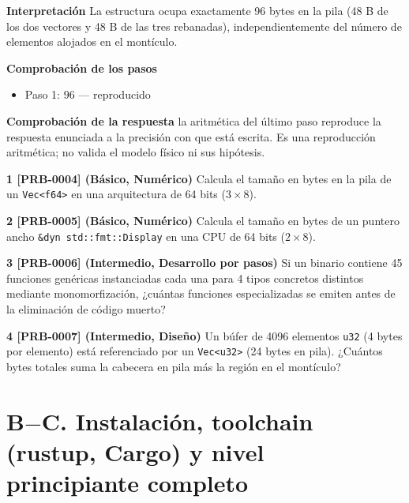 \documentclass{book}
\begin{document}
\begin{tcolorbox}[title={Problema resuelto}, studiumworked, breakable]
\noindent\textbf{Interpretación}
La estructura ocupa exactamente 96 bytes en la pila (48 B de los dos vectores y 48 B de las tres rebanadas), independientemente del número de elementos alojados en el montículo.

\noindent\textbf{Comprobación de los pasos}
\begin{itemize}
\item Paso 1: $96$ — reproducido
\end{itemize}

\noindent\textbf{Comprobación de la respuesta} la aritmética del último paso reproduce la respuesta enunciada a la precisión con que está escrita. Es una reproducción aritmética; no valida el modelo físico ni sus hipótesis.
\end{tcolorbox}

\begin{tcolorbox}[title={Ejercicios}, studiumworked, breakable]

\noindent\textbf{1 [PRB-0004] (Básico, Numérico)}
Calcula el tamaño en bytes en la pila de un \texttt{Vec<f64>} en una arquitectura de 64 bits (\(3 \times 8\)).

\noindent\textbf{2 [PRB-0005] (Básico, Numérico)}
Calcula el tamaño en bytes de un puntero ancho \texttt{\&dyn std::fmt::Display} en una CPU de 64 bits (\(2 \times 8\)).

\noindent\textbf{3 [PRB-0006] (Intermedio, Desarrollo por pasos)}
Si un binario contiene 45 funciones genéricas instanciadas cada una para 4 tipos concretos distintos mediante monomorfización, ¿cuántas funciones especializadas se emiten antes de la eliminación de código muerto?

\noindent\textbf{4 [PRB-0007] (Intermedio, Diseño)}
Un búfer de 4096 elementos \texttt{u32} (4 bytes por elemento) está referenciado por un \texttt{Vec<u32>} (24 bytes en pila). ¿Cuántos bytes totales suma la cabecera en pila más la región en el montículo?
\end{tcolorbox}

\chapter{B\(-\)C. Instalación, toolchain (rustup, Cargo) y nivel principiante completo}
\label{chap:cap02-entorno-toolchain-cargo-nivel-principiante}
\end{document}
